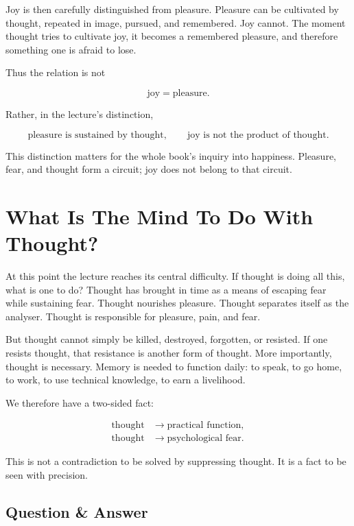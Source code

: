 Joy is then carefully distinguished from pleasure. Pleasure can be cultivated by thought, repeated in image, pursued, and remembered. Joy cannot. The moment thought tries to cultivate joy, it becomes a remembered pleasure, and therefore something one is afraid to lose.

Thus the relation is not

\begin{equation}
\text{joy} = \text{pleasure}.
\end{equation}

Rather, in the lecture's distinction,

\begin{equation}
\text{pleasure is sustained by thought},
\qquad
\text{joy is not the product of thought}.
\end{equation}

This distinction matters for the whole book's inquiry into happiness. Pleasure, fear, and thought form a circuit; joy does not belong to that circuit.

\section{What Is The Mind To Do With Thought?}

At this point the lecture reaches its central difficulty. If thought is doing all this, what is one to do? Thought has brought in time as a means of escaping fear while sustaining fear. Thought nourishes pleasure. Thought separates itself as the analyser. Thought is responsible for pleasure, pain, and fear.

But thought cannot simply be killed, destroyed, forgotten, or resisted. If one resists thought, that resistance is another form of thought. More importantly, thought is necessary. Memory is needed to function daily: to speak, to go home, to work, to use technical knowledge, to earn a livelihood.

We therefore have a two-sided fact:

\begin{align}
\text{thought} &\longrightarrow \text{practical function},\\
\text{thought} &\longrightarrow \text{psychological fear}.
\end{align}

This is not a contradiction to be solved by suppressing thought. It is a fact to be seen with precision.

\subsection{Question \& Answer}

